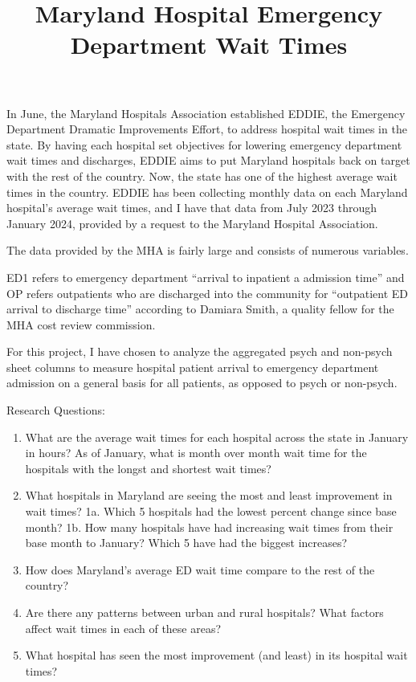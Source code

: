 \documentclass[
  letterpaper,
  DIV=11,
  numbers=noendperiod]{scrartcl}
\title{Maryland Hospital Emergency Department Wait Times}
\author{}
\date{}
\providecommand{\tightlist}{%
  \setlength{\itemsep}{0pt}\setlength{\parskip}{0pt}}\usepackage{longtable,booktabs,array}
\begin{document}
\maketitle

In June, the Maryland Hospitals Association established EDDIE, the
Emergency Department Dramatic Improvements Effort, to address hospital
wait times in the state. By having each hospital set objectives for
lowering emergency department wait times and discharges, EDDIE aims to
put Maryland hospitals back on target with the rest of the country. Now,
the state has one of the highest average wait times in the country.
EDDIE has been collecting monthly data on each Maryland hospital's
average wait times, and I have that data from July 2023 through January
2024, provided by a request to the Maryland Hospital Association.

The data provided by the MHA is fairly large and consists of numerous
variables.

ED1 refers to emergency department ``arrival to inpatient a admission
time'' and OP refers outpatients who are discharged into the community
for ``outpatient ED arrival to discharge time'' according to Damiara
Smith, a quality fellow for the MHA cost review commission.

For this project, I have chosen to analyze the aggregated psych and
non-psych sheet columns to measure hospital patient arrival to emergency
department admission on a general basis for all patients, as opposed to
psych or non-psych.

Research Questions:

\begin{enumerate}
\def\labelenumi{\arabic{enumi}.}
\tightlist
\item
  What are the average wait times for each hospital across the state in
  January in hours? As of January, what is month over month wait time
  for the hospitals with the longst and shortest wait times?
\item
  What hospitals in Maryland are seeing the most and least improvement
  in wait times? 1a. Which 5 hospitals had the lowest percent change
  since base month? 1b. How many hospitals have had increasing wait
  times from their base month to January? Which 5 have had the biggest
  increases?
\item
  How does Maryland's average ED wait time compare to the rest of the
  country?
\item
  Are there any patterns between urban and rural hospitals? What factors
  affect wait times in each of these areas?
\item
  What hospital has seen the most improvement (and least) in its
  hospital wait times?
\end{enumerate}
\end{document}
